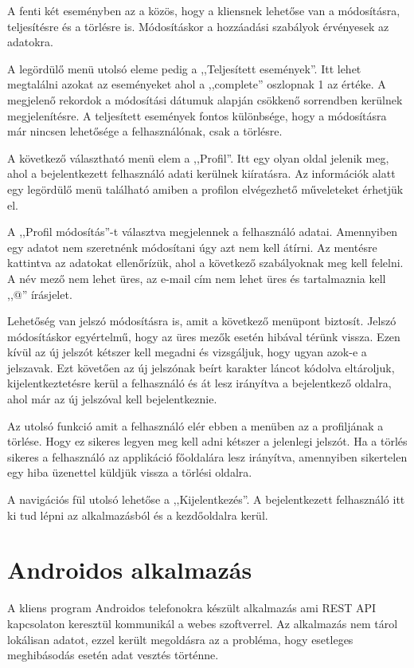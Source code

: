 \documentclass[
]{thesis-ekf}
\theoremstyle{definition}
\theoremstyle{remark}
\begin{document}
A fenti két eseményben az a közös, hogy a kliensnek lehetőse van a módosításra, teljesítésre és a törlésre is. Módosításkor a hozzáadási szabályok érvényesek az adatokra.

A legördülő menü utolsó eleme pedig a ,,Teljesített események''. Itt lehet megtalálni azokat az eseményeket ahol a ,,complete'' oszlopnak 1 az értéke. A megjelenő rekordok a módosítási dátumuk alapján csökkenő sorrendben kerülnek megjelenítésre. A teljesített események fontos különbsége, hogy a módosításra már nincsen lehetősége a felhasználónak, csak a törlésre.

A következő választható menü elem a ,,Profil''. Itt egy olyan oldal jelenik meg, ahol a bejelentkezett felhasználó adati kerülnek kiíratásra. Az információk alatt egy legördülő menü található amiben a profilon elvégezhető műveleteket érhetjük el.

A ,,Profil módosítás''-t választva megjelennek a felhasználó adatai. Amennyiben egy adatot nem szeretnénk módosítani úgy azt nem kell átírni. Az mentésre kattintva az adatokat ellenőrízük,  ahol a következő szabályoknak meg kell felelni. A név mező nem lehet üres, az e-mail cím nem lehet üres és tartalmaznia kell ,,@'' írásjelet.

Lehetőség van jelszó módosításra is, amit a következő menüpont biztosít. Jelszó módosításkor egyértelmű, hogy az üres mezők esetén hibával térünk vissza. Ezen kívül az új jelszót kétszer kell megadni és vizsgáljuk, hogy ugyan azok-e a jelszavak. Ezt követően az új jelszónak beírt karakter láncot kódolva eltároljuk, kijelentkeztetésre kerül a felhasználó és át lesz irányítva a bejelentkező oldalra, ahol már az új jelszóval kell bejelentkeznie.

Az utolsó funkció amit a felhasználó elér ebben a menüben az a profiljának a törlése. Hogy ez sikeres legyen meg kell adni kétszer a jelenlegi jelszót. Ha a törlés sikeres a felhasználó az applikáció főoldalára lesz irányítva, amennyiben sikertelen egy hiba üzenettel küldjük vissza a törlési oldalra.

A navigációs fül utolsó lehetőse a ,,Kijelentkezés''. A bejelentkezett felhasználó itt ki tud lépni az alkalmazásból és a kezdőoldalra kerül. 

\section{Androidos alkalmazás}
A kliens program Androidos telefonokra készült alkalmazás ami REST API kapcsolaton keresztül kommunikál a webes szoftverrel. Az alkalmazás nem tárol lokálisan adatot, ezzel került megoldásra az a probléma, hogy esetleges meghibásodás esetén adat vesztés történne. 
\end{document}
